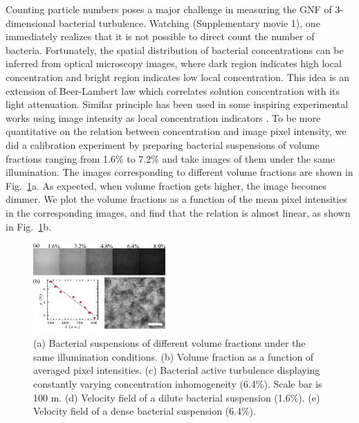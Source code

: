 \documentclass[twocolumn,aps,prl,amsmath,amssymb,longbibliography]{revtex4-2}
\begin{document}
Counting particle numbers poses a major challenge in measuring the GNF of 3-dimensional bacterial turbulence. Watching (Supplementary movie 1), one immediately realizes that it is not possible to direct count the number of bacteria. Fortunately, the spatial distribution of bacterial concentrations can be inferred from optical microscopy images, where dark region indicates high local concentration and bright region indicates low local concentration. This idea is an extension of Beer-Lambert law which correlates solution concentration with its light attenuation. Similar principle has been used in some inspiring experimental works using image intensity as local concentration indicators \cite{Wilson2011, Schaller2013}. To be more quantitative on the relation between concentration and image pixel intensity, we did a calibration experiment by preparing bacterial suspensions of volume fractions ranging from 1.6\% to 7.2\% and take images of them under the same illumination. The images corresponding to different volume fractions are shown in Fig.~\ref{fig:1}a. As expected, when volume fraction gets higher, the image becomes dimmer. We plot the volume fractions as a function of the mean pixel intensities in the corresponding images, and find that the relation is almost linear, as shown in Fig.~\ref{fig:1}b.

\begin{figure}[h]
\begin{center}
\includegraphics[width=0.45\textwidth]{figures/fig-1/v3.pdf}
\caption[Experimental details]
{
(a) Bacterial suspensions of different volume fractions under the same illumination conditions.
(b) Volume fraction as a function of averaged pixel intensities.
(c) Bacterial active turbulence displaying constantly varying concentration inhomogeneity (6.4\%). Scale bar is 100 \textmu m.
(d) Velocity field of a dilute bacterial suspension (1.6\%).
(e) Velocity field of a dense bacterial suspension (6.4\%).
}
\label{fig:1}
\end{center}
\end{figure}
\end{document}
